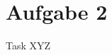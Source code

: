 
\section{Aufgabe 2}

\setcounter{exercise}{1}

\begin{frame}[allowframebreaks]{Task \thesection}{XYZ}
\end{frame}
